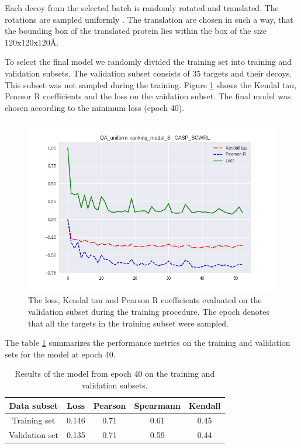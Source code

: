 \documentclass[a4paper,10pt]{article}
\begin{document}
Each decoy from the selected batch is randomly rotated and translated. The rotations are sampled uniformly \cite{}. The translation are chosen
in such a way, that the bounding box of the translated protein lies within the box of the size 120x120x120\AA. 

To select the final model we randomly divided the training set into training and validation subsets. The validation subset consists of 
35 targets and their decoys. This subset was not sampled during the training. 
Figure \ref{Fig:TrainingLoss} shows the Kendal tau, Pearsor R coefficients and the loss on the vaidation subset. 
The final model was chosen according to the minimum loss (epoch 40).
\begin{figure}[H]
    \centering
    \includegraphics[width=\linewidth]{Fig/kendall_validation.png}
    \caption{The loss, Kendal tau and Pearson R coefficients evaluated on the validation subset during the training procedure. The epoch 
    denotes that all the targets in the training subset were sampled.}
    \label{Fig:TrainingLoss}
\end{figure}

The table \ref{Tbl:TrainingResults} summarizes the performance metrics on the training and validation sets for the model at epoch 40.

\begin{table}[H]
\begin{center}
\begin{tabular}{ c | c | c | c | c }
    Data subset & Loss & Pearson & Spearmann & Kendall \\
    \hline
    Training set     &0.146 &0.71 &0.61 &0.45 \\
    Validation set   &0.135 &0.71 &0.59 &0.44 \\ \hline

\end{tabular}
  \caption {Results of the model from epoch 40 on the training and validation subsets.}
    \label{Tbl:TrainingResults}
\end{center}
\end{table}
\end{document}
